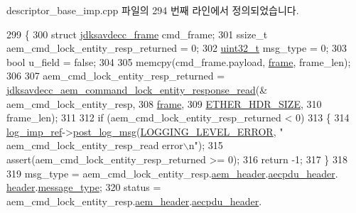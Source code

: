 descriptor\+\_\+base\+\_\+imp.\+cpp 파일의 294 번째 라인에서 정의되었습니다.


\begin{DoxyCode}
299 \{
300     \textcolor{keyword}{struct }\hyperlink{structjdksavdecc__frame}{jdksavdecc\_frame} cmd\_frame;
301     ssize\_t aem\_cmd\_lock\_entity\_resp\_returned = 0;
302     \hyperlink{parse_8c_a6eb1e68cc391dd753bc8ce896dbb8315}{uint32\_t} msg\_type = 0;
303     \textcolor{keywordtype}{bool} u\_field = \textcolor{keyword}{false};
304 
305     memcpy(cmd\_frame.payload, \hyperlink{gst__avb__playbin_8c_ac8e710e0b5e994c0545d75d69868c6f0}{frame}, frame\_len);
306 
307     aem\_cmd\_lock\_entity\_resp\_returned = 
      \hyperlink{group__command__lock__entity__response_gabf8e59d01c0f0088b701f6191dd17b6d}{jdksavdecc\_aem\_command\_lock\_entity\_response\_read}(&
      aem\_cmd\_lock\_entity\_resp,
308                                                                                          
      \hyperlink{gst__avb__playbin_8c_ac8e710e0b5e994c0545d75d69868c6f0}{frame},
309                                                                                          
      \hyperlink{namespaceavdecc__lib_a6c827b1a0d973e18119c5e3da518e65ca9512ad9b34302ba7048d88197e0a2dc0}{ETHER\_HDR\_SIZE},
310                                                                                          frame\_len);
311 
312     \textcolor{keywordflow}{if} (aem\_cmd\_lock\_entity\_resp\_returned < 0)
313     \{
314         \hyperlink{namespaceavdecc__lib_acbe3e2a96ae6524943ca532c87a28529}{log\_imp\_ref}->\hyperlink{classavdecc__lib_1_1log_a68139a6297697e4ccebf36ccfd02e44a}{post\_log\_msg}(\hyperlink{namespaceavdecc__lib_a501055c431e6872ef46f252ad13f85cdaf2c4481208273451a6f5c7bb9770ec8a}{LOGGING\_LEVEL\_ERROR}, \textcolor{stringliteral}{"
      aem\_cmd\_lock\_entity\_resp\_read error\(\backslash\)n"});
315         assert(aem\_cmd\_lock\_entity\_resp\_returned >= 0);
316         \textcolor{keywordflow}{return} -1;
317     \}
318 
319     msg\_type = aem\_cmd\_lock\_entity\_resp.\hyperlink{structjdksavdecc__aem__command__lock__entity__response_ae1e77ccb75ff5021ad923221eab38294}{aem\_header}.\hyperlink{structjdksavdecc__aecpdu__aem_ae8460ae179666e7ce268ed1ef33d0de3}{aecpdu\_header}.
      \hyperlink{structjdksavdecc__aecpdu__common_a314cacb6a61bcf18749030c0b6fb7510}{header}.\hyperlink{structjdksavdecc__aecpdu__common__control__header_aeaaffeace8c23899e558022f62ce6de4}{message\_type};
320     status = aem\_cmd\_lock\_entity\_resp.\hyperlink{structjdksavdecc__aem__command__lock__entity__response_ae1e77ccb75ff5021ad923221eab38294}{aem\_header}.\hyperlink{structjdksavdecc__aecpdu__aem_ae8460ae179666e7ce268ed1ef33d0de3}{aecpdu\_header}.

\end{DoxyCode}
